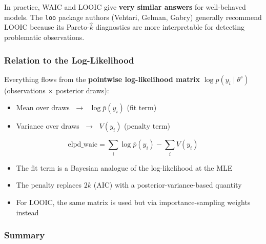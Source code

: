 \documentclass[12pt,a4paper]{article}
\begin{document}
In practice, WAIC and LOOIC give \textbf{very similar answers} for well-behaved models. The \texttt{loo} package authors (Vehtari, Gelman, Gabry) generally recommend LOOIC because its Pareto-$\hat{k}$ diagnostics are more interpretable for detecting problematic observations.

\subsubsection{Relation to the Log-Likelihood}

Everything flows from the \textbf{pointwise log-likelihood matrix} $\log p(y_i \mid \theta^s)$ (observations $\times$ posterior draws):
\begin{itemize}
  \item Mean over draws $\;\to\;$ $\log \bar{p}(y_i)$ \quad (fit term)
  \item Variance over draws $\;\to\;$ $V(y_i)$ \quad (penalty term)
\end{itemize}
\begin{equation}
  \text{elpd\_waic} = \sum_i \log \bar{p}(y_i) - \sum_i V(y_i)
\end{equation}
\begin{itemize}
  \item The fit term is a Bayesian analogue of the log-likelihood at the MLE
  \item The penalty replaces $2k$ (AIC) with a posterior-variance-based quantity
  \item For LOOIC, the same matrix is used but via importance-sampling weights instead
\end{itemize}

\subsubsection{Summary}
\end{document}
